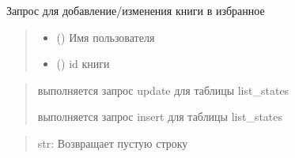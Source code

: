 \documentclass[letterpaper,10pt,russian]{sphinxmanual}
\begin{document}

\begin{fulllineitems}
\label{\detokenize{blueprints:blueprints.change_state.change_on_favorite}}
\pysigstartsignatures
{}
\pysigstopsignatures
\sphinxAtStartPar
Запрос для добавление/изменения книги в избранное
\begin{quote}\begin{description}
\begin{itemize}
\item {} 
\sphinxAtStartPar
{} () \textendash{} Имя пользователя

\item {} 
\sphinxAtStartPar
{} () \textendash{} id книги

\end{itemize}

\end{description}\end{quote}
\begin{description}
\begin{quote}\begin{description}
\sphinxAtStartPar
выполняется запрос update для таблицы list\_states

\sphinxAtStartPar
выполняется запрос insert для таблицы list\_states

\end{description}\end{quote}

\end{description}
\begin{quote}\begin{description}
\sphinxAtStartPar
str: Возвращает пустую строку

\end{description}\end{quote}

\end{fulllineitems}
\end{document}
